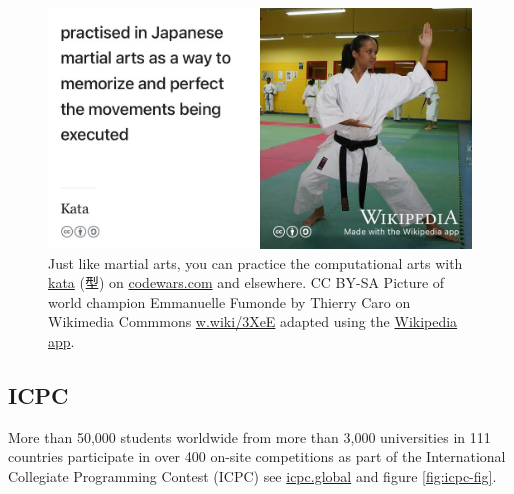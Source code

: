 \documentclass[
]{book}
\begin{document}
\begin{figure}

{\centering \includegraphics[width=0.99\linewidth]{images/kata} 

}

\caption{Just like martial arts, you can practice the computational arts with \href{https://en.wikipedia.org/wiki/Kata}{kata} (型) on \href{https://www.codewars.com}{codewars.com} and elsewhere. CC BY-SA Picture of world champion Emmanuelle Fumonde by Thierry Caro on Wikimedia Commmons \href{https://w.wiki/3XeE}{w.wiki/3XeE} adapted using the \href{https://apps.apple.com/us/app/wikipedia/id324715238}{Wikipedia app}.}\label{fig:codewars-kata-fig}
\end{figure}



\hypertarget{icpc}{%
\subsection{ICPC}\label{icpc}}

More than 50,000 students worldwide from more than 3,000 universities in 111 countries participate in over 400 on-site competitions as part of the International Collegiate Programming Contest (ICPC) see \href{https://icpc.global/}{icpc.global} and figure \ref{fig:icpc-fig}.
\end{document}
